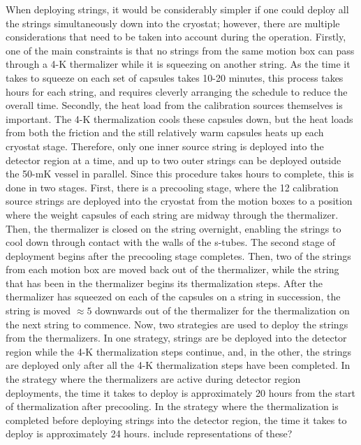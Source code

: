 When deploying strings, it would be considerably simpler if one could deploy all the strings simultaneously down into the cryostat; however, there are multiple considerations that need to be taken into account during the operation.
Firstly, one of the main constraints is that no strings from the same motion box can pass through a 4-K thermalizer while it is squeezing on another string.
As the time it takes to squeeze on each set of capsules takes 10-20 minutes, this process takes hours for each string, and requires cleverly arranging the schedule to reduce the overall time.
Secondly, the heat load from the calibration sources themselves is important.
The 4-K thermalization cools these capsules down, but the heat loads from both the friction and the still relatively warm capsules heats up each cryostat stage.
Therefore, only one inner source string is deployed into the detector region at a time, and up to two outer strings can be deployed outside the 50-mK vessel in parallel.
Since this procedure takes hours to complete, this is done in two stages.
First, there is a precooling stage, where the 12 calibration source strings are deployed into the cryostat from the motion boxes to a position where the weight capsules of each string are midway through the thermalizer.
Then, the thermalizer is closed on the string overnight, enabling the strings to cool down through contact with the walls of the s-tubes.
The second stage of deployment begins after the precooling stage completes. Then, two of the strings from each motion box are moved back out of the thermalizer, while the string that has been in the thermalizer begins its thermalization steps.
After the thermalizer has squeezed on each of the capsules on a string in succession, the string is moved $\approx5$ downwards out of the thermalizer for the thermalization on the next string to commence.
Now, two strategies are used to deploy the strings from the thermalizers.
In one strategy, strings are be deployed into the detector region while the 4-K thermalization steps continue, and, in the other, the strings are deployed only after all the 4-K thermalization steps have been completed.
In the strategy where the thermalizers are active during detector region deployments, the time it takes to deploy is approximately 20 hours from the start of thermalization after precooling.
In the strategy where the thermalization is completed before deploying strings into the detector region, the time it takes to deploy is approximately 24 hours.
\color{red} include representations of these?\color{black}

